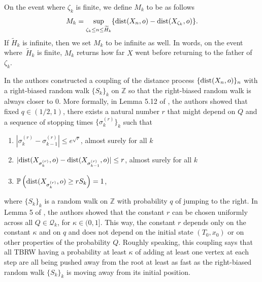 \documentclass[a4paper]{amsart}
\newcommand{\hitfetak}{\widetilde{H}}
\newcommand{\D}[1]{{\rm dist}(X_{#1},o)}
\begin{document}
On the event where $\zeta_k$ is finite, we define $M_k$ to be as follows
\begin{equation}
    M_k = \sup_{\zeta_k \le n \le \hitfetak_k} \{\D{n} - \D{\zeta_k}\}.
\end{equation}
If $\hitfetak_k$ is infinite, then we set $M_k$ to be infinite as well. In words, on the event where~$\hitfetak_k$ is finite, $M_k$ returns how far $X$ went before returning to the father of $\zeta_k$.

In \cite{figueiredo2017building} the authors constructed a coupling of the distance process $\{\D{n}\}_n$ with a right-biased random walk $\{S_k\}_k$ on $\mathbb{Z}$ so that the right-biased random walk is always closer to $0$. More formally, in Lemma 5.12 of \cite{figueiredo2017building}, the authors showed that fixed $q \in (1/2,1)$, there exists a natural number $r$ that might depend on $Q$ and a sequence of stopping times $\{\sigma_k^{(r)}\}_k$ such that 
\begin{enumerate}
    \item  $|\sigma_k^{(r)} - \sigma_{k-1}^{(r)}| \le e^{\sqrt{r}}$, almost surely for all $k$
    \item  $|\D{\sigma^{(r)}_{k}} - \D{\sigma^{(r)}_{k-1}}| \le r$, almost surely for all $k$
    \item $\mathbb{P}\left(\D{\sigma^{(r)}_{k}} \ge rS_k\right) = 1$,
\end{enumerate}
where $\{S_k\}_k$ is a random walk on $\mathbb{Z}$ with probability $q$ of jumping to the right.
In Lemma 5 of \cite{ribeiro2023}, the authors showed that the constant $r$ can be chosen uniformly across all $Q\in \mathcal{Q}_k$, for $\kappa \in (0,1]$. This way, the constant $r$ depends only on the constant $\kappa$ and on $q$ and does not depend on the initial state $(T_0,x_0)$ or on other properties of the probability $Q$. Roughly speaking, this coupling says that all TBRW having a probability at least $\kappa$ of adding at least one vertex at each step are all being pushed away from the root at least as fast as the right-biased random walk $\{S_k\}_k$ is moving away from its initial position.
\end{document}
